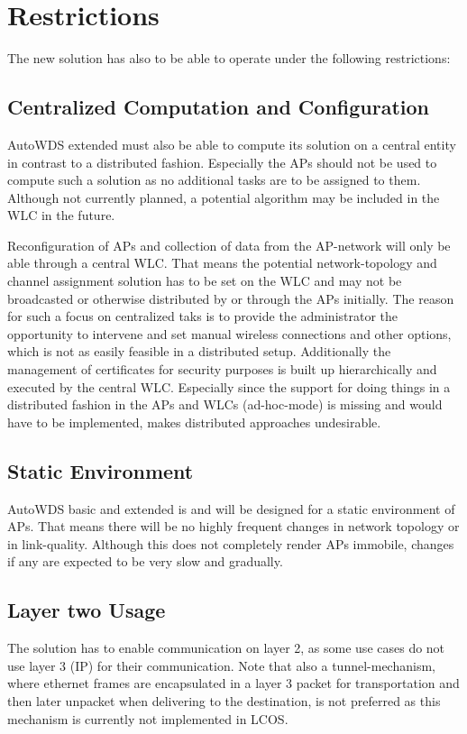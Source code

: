   \section{Restrictions}
    The new solution has also to be able to operate under the following restrictions:
    
    \subsection{Centralized Computation and Configuration}
      AutoWDS extended must also be able to compute its solution on a central entity in contrast to a distributed fashion.
      Especially the APs should not be used to compute such a solution as no additional tasks are to be assigned to them.
      Although not currently planned, a potential algorithm may be included in the WLC in the future.
      
      Reconfiguration of APs and collection of data from the AP-network will only be able through a central \ac{WLC}.
      That means the potential network-topology and channel assignment solution has to be set on the WLC and may not be broadcasted or otherwise
      distributed by or through the APs initially. The reason for such a focus on centralized taks is to provide the administrator the 
      opportunity to intervene and set manual wireless connections and other options, which is not as easily feasible in a distributed setup. 
      Additionally the management of certificates for security purposes is built up hierarchically and executed by the central \ac{WLC}.
      Especially since the support for doing things in a distributed fashion in the APs and WLCs (ad-hoc-mode) is missing and would have to be implemented, 
      makes distributed approaches undesirable.
      
    \subsection{Static Environment}
      AutoWDS basic and extended is and will be designed for a static environment of APs. That means there will be no highly frequent changes in
      network topology or in link-quality. Although this does not completely render APs immobile, changes if any are expected to be very slow and gradually.
      
    \subsection{Layer two Usage}
      The solution has to enable communication on layer 2, as some use cases do not use layer 3 (IP) for their communication.
      Note that also a tunnel-mechanism, where ethernet frames are encapsulated in a layer 3 packet for transportation and then later unpacket when delivering to the destination,
      is not preferred as this mechanism is currently not implemented in LCOS.
    
